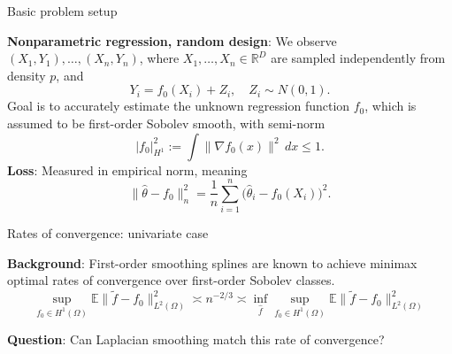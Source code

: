 \documentclass[xcolor=dvipsnames]{beamer}
\newcommand{\Reals}{\mathbb{R}}
\newcommand{\wh}[1]{\widehat{#1}}
\newcommand{\wt}[1]{\widetilde{#1}}
\begin{document}
\begin{frame}{Basic problem setup}

{\bf Nonparametric regression, random design}: We observe $(X_1,Y_1),\ldots,(X_n,Y_n)$, where $X_1,\ldots,X_n \in \Reals^D$ are sampled independently from density $p$, and
\begin{equation*}
Y_i = f_0(X_i) + Z_i, \quad Z_i \sim N(0,1).
\end{equation*}
Goal is to accurately estimate the unknown regression function $f_0$, which is assumed to be first-order \alert{Sobolev} smooth, with semi-norm
\begin{equation*}
|f_0|_{H^1}^2 := \int \|\nabla f_0(x)\|^2 \,dx \leq 1.
\end{equation*}
{\bf Loss}: Measured in \alert{empirical norm}, meaning
\begin{equation*}
\|\wh{\theta} - f_0\|_n^2 = \frac{1}{n}\sum_{i = 1}^{n} \bigl(\wh{\theta}_i - f_0(X_i)\bigr)^2.
\end{equation*}
\end{frame}



\begin{frame}[t]{Rates of convergence: univariate case}

{\bf Background}: First-order smoothing splines are known to achieve minimax optimal rates of convergence over first-order Sobolev classes.
\begin{equation*}
\sup_{f_0 \in H^1(\Omega)} \mathbb{E}\|\wt{f} - f_0\|_{L^2(\Omega)}^2 \asymp n^{-2/3} \asymp \inf_{\wh{f}}\sup_{f_0 \in H^1(\Omega)} \mathbb{E}\|\wt{f} - f_0\|_{L^2(\Omega)}^2
\end{equation*}

{\bf Question}: Can Laplacian smoothing match this rate of convergence?

\end{frame}
\end{document}

